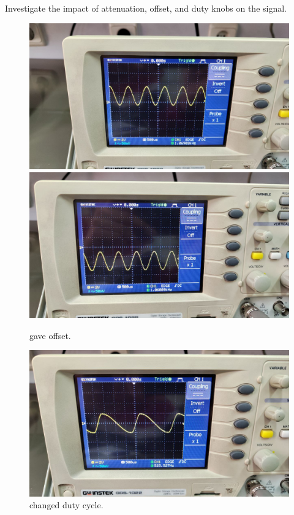 \documentclass[11pt]{article}
\newcommand{\PicScale}{0.2}
\begin{document}
\begin{question}
\begin{subquestion}{Investigate the impact of attenuation, offset, and duty knobs on the signal.}
{            \begin{figure}[H]
                \begin{center}
                    \includegraphics[scale=0.1]{Fig/4.jpeg}
                    \includegraphics[scale=0.1]{Fig/5.jpeg}
                    \caption{gave offset.}
                \end{center}
            \end{figure}

            \begin{figure}[H]
                \begin{center}
                    \includegraphics[scale=\PicScale]{Fig/6.jpeg}
                    \caption{changed duty cycle.}
                \end{center}
            \end{figure}
        }
    \end{subquestion}


\end{question}
\end{document}
